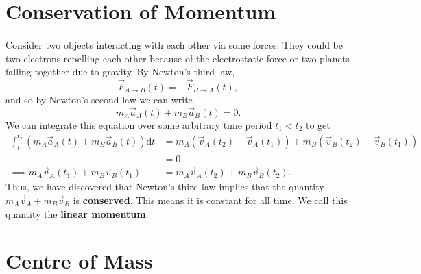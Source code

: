 \documentclass[../newtonian_mechanics.tex]{subfiles}
\begin{document}
    \section{Conservation of Momentum}
        \paragraph{}
        Consider two objects interacting with each other via some forces.
        They could be two electrons repelling each other because of the electrostatic force or two planets falling together due to gravity.
        By Newton's third law,
        \begin{equation}
            \vec{F}_{A\to B}(t)=-\vec{F}_{B\to A}(t),
        \end{equation}
        and so by Newton's second law we can write
        \begin{equation}\label{eq-COM-acc}
            m_A\vec{a}_A(t)+m_B\vec{a}_B(t)=0.
        \end{equation}
        We can integrate this equation over some arbitrary time period $t_1<t_2$ to get
        \begin{align}
            \int_{t_1}^{t_2}\left(m_A\vec{a}_A(t)+m_B\vec{a}_B(t)\right)\mathrm{d}t &= m_A\left(\vec{v}_A(t_2)-\vec{v}_A(t_1)\right) + m_B\left(\vec{v}_B(t_2)-\vec{v}_B(t_1)\right)\\
            &=0\\
            \implies m_A\vec{v}_A(t_1) + m_B\vec{v}_B(t_1) &= m_A\vec{v}_A(t_2) + m_B\vec{v}_B(t_2).
        \end{align}
        Thus, we have discovered that Newton's third law implies that the quantity $m_A\vec{v}_A+m_B\vec{v}_B$ is \textbf{conserved}.
        This means it is constant for all time. We call this quantity the \textbf{linear momentum}.

    \section{Centre of Mass}
\end{document}
